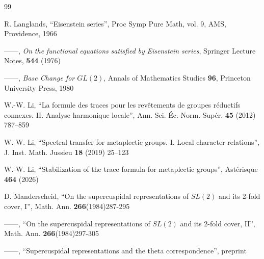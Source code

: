 \documentclass[12pt,letterpaper,openany]{book}
\theoremstyle{plain}
\theoremstyle{definition}
\theoremstyle{remark}
\theoremstyle{remark}
\begin{document}
\begin{thebibliography}{99}

 R. Langlands, ``Eisenstein series'', Proc Symp Pure Math,
vol. 9, AMS, Providence, 1966

 ------, \emph{On} \emph{the} \emph{functional}
\emph{equations} \emph{satisfied}
\emph{by} \emph{Eisenstein}
\emph{series}, Springer Lecture Notes, \textbf{544} (1976)


 ------, \emph{Base Change for $GL(2)$},
Annals of Mathematics Studies \textbf{96},
Princeton University Press, 1980





 W.-W. Li, ``La formule des traces pour les rev\^etements
de groupes r\'eductifs connexes. II. Analyse harmonique locale'', Ann. Sci.
\'Ec. Norm. Sup\'er. \textbf{45} (2012) 787--859

 W.-W. Li, ``Spectral transfer for metaplectic groups. I.
Local character relations'', J. Inst. Math. Jussieu \textbf{18} (2019)
25--123

 W.-W. Li, ``Stabilization of the trace formula for
metaplectic groups'', Ast\'erisque \textbf{464} (2026)

 D. Manderscheid, ``On the supercuspidal representations of
$SL(2)$ and its 2-fold cover, I'', Math. Ann. \textbf{266}(1984)287-295

 ------, ``On the supercuspidal representations of
$SL(2)$ and its 2-fold cover, II'', Math. Ann.
\textbf{266}(1984)297-305

 ------, ``Supercuspidal representations and the
theta correspondence'', preprint


\end{thebibliography}
\end{document}
